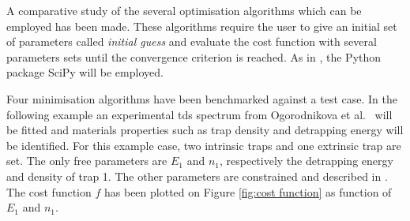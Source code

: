 A comparative study of the several optimisation algorithms which can be employed has been made.
These algorithms require the user to give an initial set of parameters called \textit{initial guess} and evaluate the cost function with several parameters sets until the convergence criterion is reached.
As in , the Python package SciPy  will be employed.

Four minimisation algorithms have been benchmarked against a test case.
In the following example an experimental \gls{tds} spectrum from Ogorodnikova et al.\  will be fitted and materials properties such as trap density and detrapping energy will be identified.
For this example case, two intrinsic traps and one extrinsic trap are set.
The only free parameters are $E_1$ and $n_1$, respectively the detrapping energy and density of trap 1.
The other parameters are constrained and described in .
The cost function $f$ has been plotted on Figure \ref{fig:cost function} as function of $E_1$ and $n_1$.

